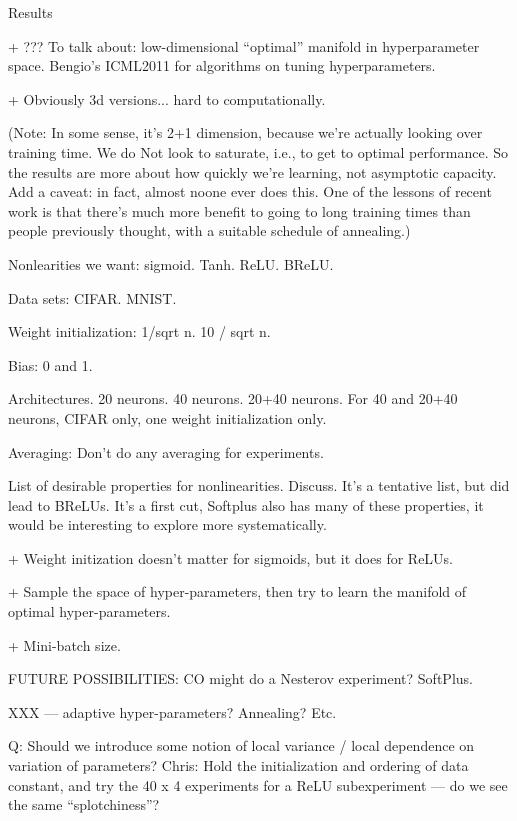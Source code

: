 \documentclass[10pt]{article}
\begin{document}
Results

+ ??? To talk about: low-dimensional ``optimal'' manifold in
hyperparameter space.  Bengio's ICML2011 for algorithms on tuning
hyperparameters.

+ Obviously 3d versions... hard to computationally.

(Note: In some sense, it's 2+1 dimension, because we're actually
looking over training time.  We do Not look to saturate, i.e., to
get to optimal performance.  So the results are more about how quickly
we're learning, not asymptotic capacity.  Add a caveat: in fact,
almost noone ever does this.  One of the lessons of recent work is
that there's much more benefit to going to long training times than
people previously thought, with a suitable schedule of annealing.)







Nonlearities we want: sigmoid.  Tanh.  ReLU.  BReLU.

Data sets: CIFAR.  MNIST.

Weight initialization: 1/sqrt n.  10 / sqrt n.

Bias: 0 and 1.

Architectures.  20 neurons. 40 neurons.  20+40 neurons.  For 40 and
20+40 neurons, CIFAR only, one weight initialization only.

Averaging: Don't do any averaging for experiments.

List of desirable properties for nonlinearities.  Discuss.  It's a
tentative list, but did lead to BReLUs.  It's a first cut, Softplus
also has many of these properties, it would be interesting to explore
more systematically.


+ Weight initization doesn't matter for sigmoids, but it does for ReLUs.

+ Sample the space of hyper-parameters, then try to learn the manifold
of optimal hyper-parameters.

+ Mini-batch size.

FUTURE POSSIBILITIES: CO might do a Nesterov experiment?  SoftPlus.

XXX --- adaptive hyper-parameters?  Annealing?  Etc.

Q: Should we introduce some notion of local variance / local
dependence on variation of parameters?  Chris: Hold the initialization
and ordering of data constant, and try the 40 x 4 experiments for a
ReLU subexperiment --- do we see the same ``splotchiness''?
\end{document}
